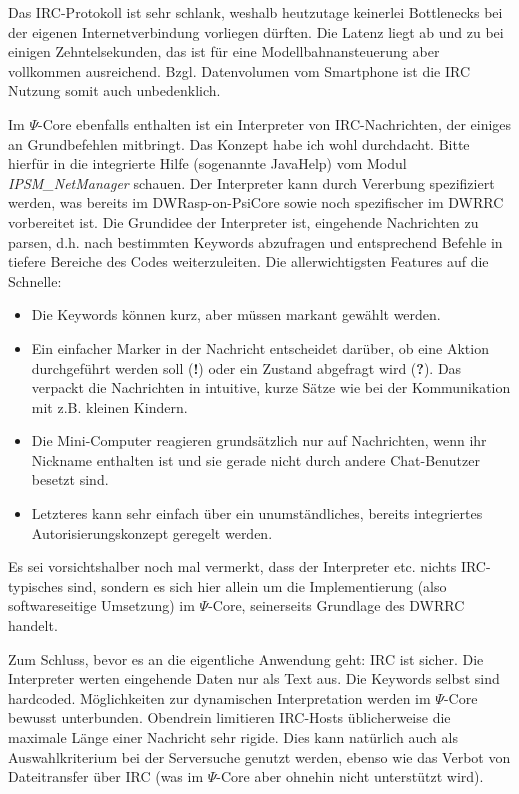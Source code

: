Das IRC-Protokoll ist sehr schlank, weshalb heutzutage keinerlei Bottlenecks bei der eigenen Internetverbindung vorliegen d\"urften.
Die Latenz liegt ab und zu bei einigen Zehntelsekunden, das ist f\"ur eine Modellbahnansteuerung aber vollkommen ausreichend.
Bzgl. Datenvolumen vom Smartphone ist die IRC Nutzung somit auch unbedenklich.

Im $\Psi$-Core ebenfalls enthalten ist ein Interpreter von IRC-Nachrichten, der einiges an Grundbefehlen mitbringt.
Das Konzept habe ich wohl durchdacht.
Bitte hierf\"ur in die integrierte Hilfe (sogenannte JavaHelp) vom Modul \textit{IPSM\_NetManager} schauen.
Der Interpreter kann durch Vererbung spezifiziert werden, was bereits im DWRasp-on-PsiCore sowie noch spezifischer im DWRRC vorbereitet ist.
Die Grundidee der Interpreter ist, eingehende Nachrichten zu parsen, d.h. nach bestimmten Keywords abzufragen und entsprechend Befehle in tiefere Bereiche des Codes weiterzuleiten.
Die allerwichtigsten Features auf die Schnelle:
\begin{itemize}
	\item Die Keywords k\"onnen kurz, aber m\"ussen markant gew\"ahlt werden.
	\item Ein einfacher Marker in der Nachricht entscheidet dar\"uber, ob eine Aktion durchgef\"uhrt werden soll (\textbf{!}) oder ein Zustand abgefragt wird (\textbf{?}).
	Das verpackt die Nachrichten in intuitive, kurze S\"atze wie bei der Kommunikation mit z.B. kleinen Kindern.
	\item Die Mini-Computer reagieren grunds\"atzlich nur auf Nachrichten, wenn ihr Nickname enthalten ist und sie gerade nicht durch andere Chat-Benutzer besetzt sind.
	\item Letzteres kann sehr einfach \"uber ein unumst\"andliches, bereits integriertes Autorisierungskonzept geregelt werden.
\end{itemize}
Es sei vorsichtshalber noch mal vermerkt, dass der Interpreter etc. nichts IRC-typisches sind, sondern es sich hier allein um die Implementierung (also softwareseitige Umsetzung) im $\Psi$-Core, seinerseits Grundlage des DWRRC handelt.

Zum Schluss, bevor es an die eigentliche Anwendung geht:
IRC ist sicher.
Die Interpreter werten eingehende Daten nur als Text aus.
Die Keywords selbst sind hardcoded.
M\"oglichkeiten zur dynamischen Interpretation werden im $\Psi$-Core bewusst unterbunden.
Obendrein limitieren IRC-Hosts \"ublicherweise die maximale L\"ange einer Nachricht sehr rigide.
Dies kann nat\"urlich auch als Auswahlkriterium bei der Serversuche genutzt werden, ebenso wie das Verbot von Dateitransfer \"uber IRC (was im $\Psi$-Core aber ohnehin nicht unterst\"utzt wird).

